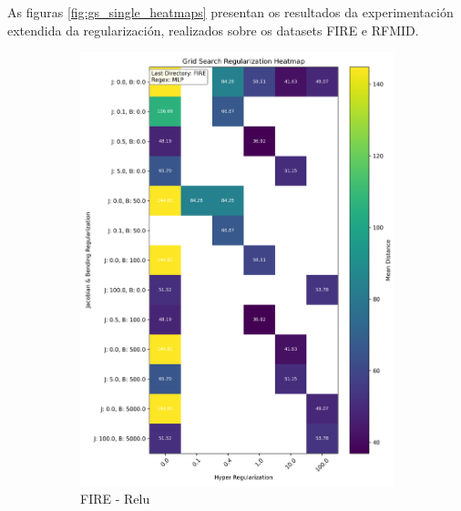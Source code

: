 As figuras \ref{fig:gs_single_heatmaps} presentan os resultados da experimentación extendida da regularización, realizados sobre os datasets FIRE e RFMID.

\begin{figure}[ht]
    \centering
    \begin{subfigure}[b]{0.4\textwidth}
        \centering
        \includegraphics[width=\textwidth]{imaxes/grid_search_single_heatmap_FIRE_MLP.png}
        \caption{FIRE - Relu}
        \label{fig:gs_single_FIRE_MLP}
    \end{subfigure}\hfill
    \begin{subfigure}[b]{0.4\textwidth}
        \centering

\end{subfigure}
\end{figure}

